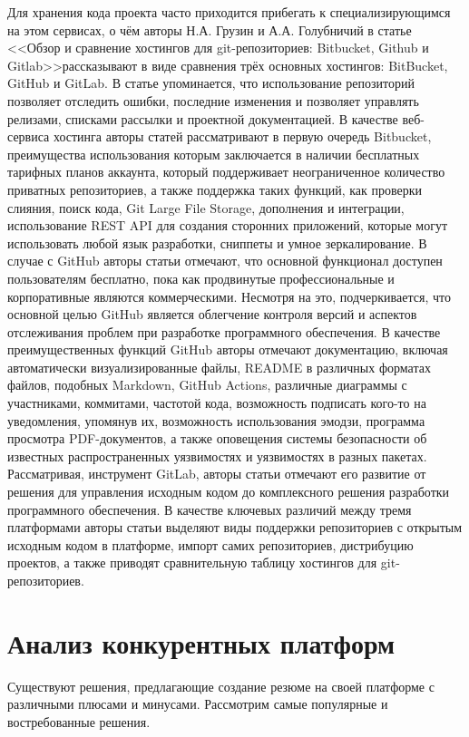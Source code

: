 \documentclass[master, och, diploma]{SCWorks}
\begin{document}
Для хранения кода проекта часто приходится прибегать к специализирующимся на этом сервисах, о чём авторы Н.А. Грузин и А.А. Голубничий в статье <<Обзор и сравнение хостингов для git-репозиториев: Bitbucket, Github и Gitlab>>рассказывают в виде сравнения трёх основных хостингов: BitBucket, GitHub и GitLab. В статье упоминается, что использование репозиторий позволяет отследить ошибки, последние изменения и позволяет управлять релизами, списками рассылки и проектной документацией\cite{Gruzin_2021}. В качестве веб-сервиса хостинга авторы статей рассматривают в первую очередь Bitbucket, преимущества использования которым заключается в наличии бесплатных тарифных планов аккаунта, который поддерживает неограниченное количество приватных репозиториев, а также поддержка таких функций, как проверки слияния, поиск кода, Git Large File Storage, дополнения и интеграции, использование REST API для создания сторонних приложений, которые могут использовать любой язык разработки, сниппеты и умное зеркалирование\cite{Arhipov_2015}. В случае с GitHub авторы статьи отмечают, что основной функционал доступен пользователям бесплатно, пока как продвинутые профессиональные и корпоративные являются коммерческими. Несмотря на это, подчеркивается, что основной целью GitHub является облегчение контроля версий и аспектов отслеживания проблем при разработке программного обеспечения. В качестве преимущественных функций GitHub авторы отмечают документацию, включая автоматически визуализированные файлы, README в различных форматах файлов, подобных Markdown, GitHub Actions, различные диаграммы с участниками, коммитами, частотой кода, возможность подписать кого-то на уведомления, упомянув их, возможность использования эмодзи, программа просмотра PDF-документов, а также оповещения системы безопасности об известных распространенных уязвимостях и уязвимостях в разных пакетах\cite{Chacon_2017}. Рассматривая, инструмент GitLab, авторы статьи отмечают его развитие от решения для управления исходным кодом до комплексного решения разработки программного обеспечения. В качестве ключевых различий между тремя платформами авторы статьи выделяют виды поддержки репозиториев с открытым исходным кодом в платформе, импорт самих репозиториев, дистрибуцию проектов, а также приводят сравнительную таблицу хостингов для git-репозиториев\cite{github_vs}.






\section{Анализ конкурентных платформ}
Существуют решения, предлагающие создание резюме на своей платформе с различными плюсами и минусами. Рассмотрим самые популярные и востребованные решения.
\end{document}
